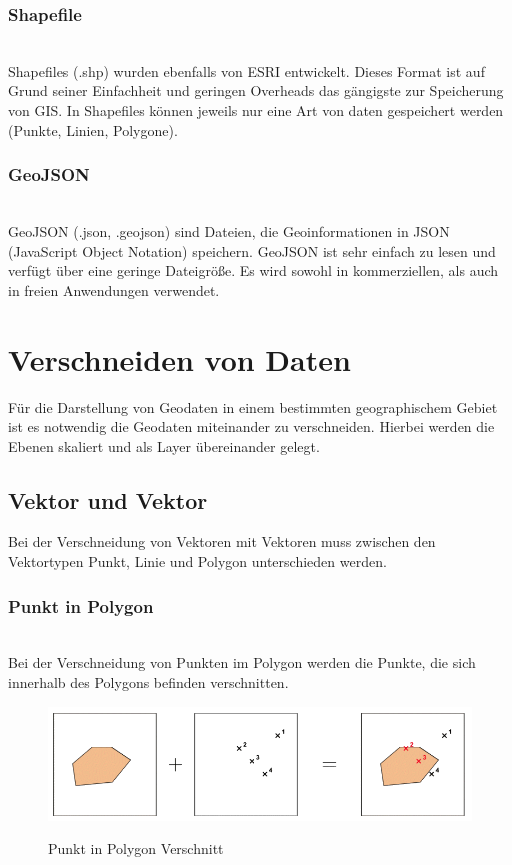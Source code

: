 \documentclass[10pt,conference,compsocconf]{IEEEtran}
\begin{document}
\subsubsection{Shapefile}\hspace*{\fill} \\
Shapefiles (.shp) wurden ebenfalls von ESRI entwickelt. Dieses Format ist auf Grund seiner Einfachheit und geringen Overheads das gängigste zur Speicherung von GIS. In Shapefiles können jeweils nur eine Art von daten gespeichert werden (Punkte, Linien, Polygone).

\subsubsection{GeoJSON}\hspace*{\fill} \\
GeoJSON (.json, .geojson) sind Dateien, die Geoinformationen in JSON (JavaScript Object Notation) speichern. GeoJSON ist sehr einfach zu lesen und verfügt über eine geringe Dateigröße. Es wird sowohl in kommerziellen, als auch in freien Anwendungen verwendet.


\section{Verschneiden von Daten}
Für die Darstellung von Geodaten in einem bestimmten geographischem Gebiet ist es notwendig die Geodaten miteinander zu verschneiden. Hierbei werden die Ebenen skaliert und als Layer übereinander gelegt.

\subsection{Vektor und Vektor}
Bei der Verschneidung von Vektoren mit Vektoren muss zwischen den Vektortypen Punkt, Linie und Polygon unterschieden werden.

\subsubsection{Punkt in Polygon}\hspace*{\fill} \\
Bei der Verschneidung von Punkten im Polygon werden die Punkte, die sich innerhalb des Polygons befinden verschnitten.

\begin{figure}[H]
  \centering
  	\includegraphics[width=\columnwidth]{img/punkt_in_polygon}\\
  \caption[]{Punkt in Polygon Verschnitt\cite{mariuszMaster}}
  \label{img:punkt_in_polygon}
\end{figure}
\end{document}
